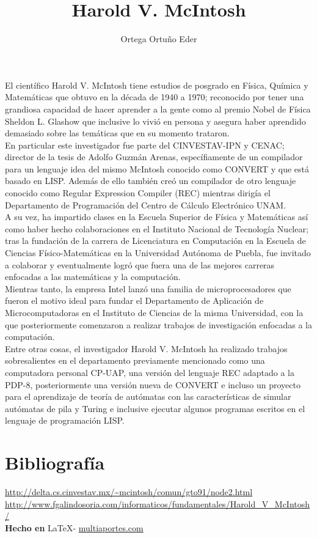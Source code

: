 \documentclass{article}
\title{Harold V. McIntosh}
\author{Ortega Ortu\~no Eder}
\date{} %
\begin{document}
	\maketitle
	\normalsize{
El científico Harold V. McIntosh tiene estudios de posgrado en Física, Química y Matemáticas que obtuvo en la década de 1940 a 1970; reconocido por tener una grandiosa capacidad de hacer aprender a la gente como al premio Nobel de Física Sheldon L. Glashow que inclusive lo vivió en persona y asegura haber aprendido demasiado sobre las temáticas que en su momento trataron.
\\

En particular este investigador fue parte del CINVESTAV-IPN y CENAC; director de la tesis de Adolfo Guzmán Arenas, específiamente de un compilador para un lenguaje idea del mismo McIntosh conocido como CONVERT y que está basado en LISP. Además de ello también creó un compilador de otro lenguaje conocido como Regular Expression Compiler (REC) mientras dirigía el Departamento de Programación del Centro de Cálculo Electrónico UNAM.
\\

A su vez, ha impartido clases en la Escuela Superior de Física y Matemáticas así como haber hecho colaboraciones en el Instituto Nacional de Tecnología Nuclear; tras la fundación de la carrera de Licenciatura en Computación en la Escuela de Ciencias Físico-Matemáticas en la Universidad Autónoma de Puebla, fue invitado a colaborar y eventualmente logró que fuera una de las mejores carreras enfocadas a las matemáticas y la computación.
\\

Mientras tanto, la empresa Intel lanzó una familia de microprocesadores que fueron el motivo ideal para fundar el Departamento de Aplicación de Microcomputadoras en el Instituto de Ciencias de la misma Universidad, con la que posteriormente comenzaron a realizar trabajos de investigación enfocadas a la computación.
\\

Entre otras cosas, el investigador Harold V. McIntosh ha realizado trabajos sobresalientes en el departamento previamente mencionado como una computadora personal CP-UAP, una versión del lenguaje REC adaptado a la PDP-8, posteriormente una versión nueva de CONVERT e incluso un proyecto para el aprendizaje de teoría de autómatas con las características de simular autómatas de pila y Turing e inclusive ejecutar algunos programas escritos en el lenguaje de programación LISP.
}

\vspace{1cm}

\section*{Bibliograf\'ia}

\noindent \url{http://delta.cs.cinvestav.mx/~mcintosh/comun/gto91/node2.html}
\\
\noindent \url{http://www.fgalindosoria.com/informaticos/fundamentales/Harold_V_McIntosh/}
\\

\large{\hfill \textbf{Hecho en } \LaTeX - \url{multiaportes.com}}
\end{document}
